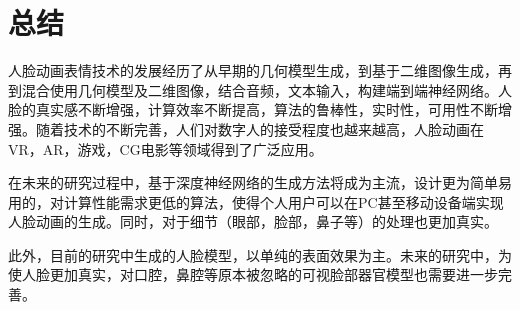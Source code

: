 \documentclass{ctexart}
\begin{document}
\section{\hei 总结}
人脸动画表情技术的发展经历了从早期的几何模型生成，到基于二维图像生成，再到混合使用几何模型及二维图像，结合音频，文本输入，构建端到端神经网络。人脸的真实感不断增强，计算效率不断提高，算法的鲁棒性，实时性，可用性不断增强。随着技术的不断完善，人们对数字人的接受程度也越来越高，人脸动画在VR，AR，游戏，CG电影等领域得到了广泛应用。\par
在未来的研究过程中，基于深度神经网络的生成方法将成为主流，设计更为简单易用的，对计算性能需求更低的算法，使得个人用户可以在PC甚至移动设备端实现人脸动画的生成。同时，对于细节（眼部，脸部，鼻子等）的处理也更加真实。\par
此外，目前的研究中生成的人脸模型，以单纯的表面效果为主。未来的研究中，为使人脸更加真实，对口腔，鼻腔等原本被忽略的可视脸部器官模型也需要进一步完善。
\end{document}
